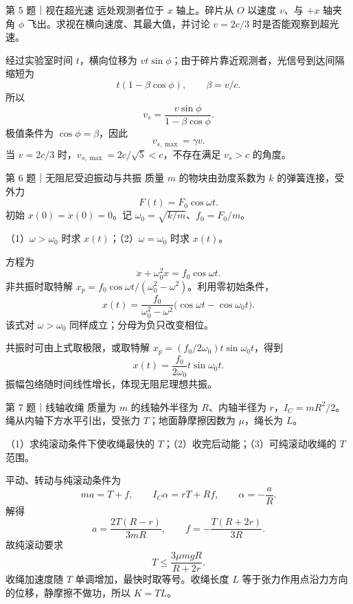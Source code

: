 \begin{problem}{第 5 题｜视在超光速}
远处观测者位于 $x$ 轴上。碎片从 $O$ 以速度 $v$、与 $+x$ 轴夹角 $\phi$ 飞出。求视在横向速度、其最大值，并讨论 $v=2c/3$ 时是否能观察到超光速。
\FigSuperluminal
\end{problem}
\begin{solution}
经过实验室时间 $t$，横向位移为 $vt\sin\phi$；由于碎片靠近观测者，光信号到达间隔缩短为
\[
t(1-\beta\cos\phi),\qquad \beta=v/c.
\]
所以
\[
v_s=\frac{v\sin\phi}{1-\beta\cos\phi}.
\]
极值条件为 $\cos\phi=\beta$，因此
\[
v_{s,\max}=\gamma v.
\]
当 $v=2c/3$ 时，$v_{s,\max}=2c/\sqrt5<c$，不存在满足 $v_s>c$ 的角度。
\end{solution}

\begin{problem}{第 6 题｜无阻尼受迫振动与共振}
质量 $m$ 的物块由劲度系数为 $k$ 的弹簧连接，受外力
\[
F(t)=F_0\cos\omega t.
\]
初始 $x(0)=\dot x(0)=0$。记 $\omega_0=\sqrt{k/m}$、$f_0=F_0/m$。

（1）$\omega>\omega_0$ 时求 $x(t)$；（2）$\omega=\omega_0$ 时求 $x(t)$。
\FigForcedOsc
\end{problem}
\begin{solution}
方程为
\[
\ddot x+\omega_0^2x=f_0\cos\omega t.
\]
非共振时取特解 $x_p=f_0\cos\omega t/(\omega_0^2-\omega^2)$。利用零初始条件，
\[
\boxed{x(t)=\frac{f_0}{\omega_0^2-\omega^2}\bigl(\cos\omega t-\cos\omega_0t\bigr)}.
\]
该式对 $\omega>\omega_0$ 同样成立；分母为负只改变相位。

共振时可由上式取极限，或取特解 $x_p=(f_0/2\omega_0)t\sin\omega_0t$，得到
\[
\boxed{x(t)=\frac{f_0}{2\omega_0}t\sin\omega_0t}.
\]
振幅包络随时间线性增长，体现无阻尼理想共振。
\end{solution}

\begin{problem}{第 7 题｜线轴收绳}
质量为 $m$ 的线轴外半径为 $R$、内轴半径为 $r$，$I_C=mR^2/2$。绳从内轴下方水平引出，受张力 $T$；地面静摩擦因数为 $\mu$，绳长为 $L$。

（1）求纯滚动条件下使收绳最快的 $T$；（2）收完后动能；（3）可纯滚动收绳的 $T$ 范围。
\FigSpool
\end{problem}
\begin{solution}
平动、转动与纯滚动条件为
\[
ma=T+f,
\qquad
I_C\alpha=rT+Rf,
\qquad
\alpha=-\frac aR.
\]
解得
\[
a=\frac{2T(R-r)}{3mR},
\qquad
f=-\frac{T(R+2r)}{3R}.
\]
故纯滚动要求
\[
T\le\frac{3\mu mgR}{R+2r}.
\]
收绳加速度随 $T$ 单调增加，最快时取等号。收绳长度 $L$ 等于张力作用点沿力方向的位移，静摩擦不做功，所以 $K=TL$。
\end{solution}

